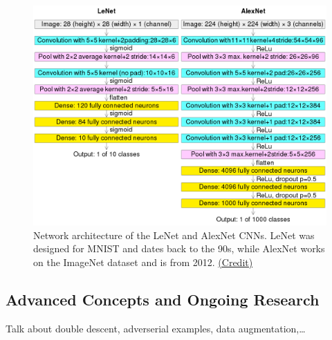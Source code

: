 \documentclass{article}
\begin{document}
\begin{figure}[h!]
    \centering
    \includegraphics[width=0.7\linewidth]{lenet_alexnet}
    \caption{Network architecture of the LeNet and AlexNet CNNs. LeNet was designed for MNIST and dates back to the 90s, while AlexNet works on the ImageNet dataset and is from 2012. \href{https://commons.wikimedia.org/wiki/File:Comparison\_image\_neural\_networks.svg}{(Credit)}}
    \label{fig:lenet_alexnet}
\end{figure}

\subsection{Advanced Concepts and Ongoing Research}
Talk about double descent, adverserial examples, data augmentation,\dots
\end{document}
